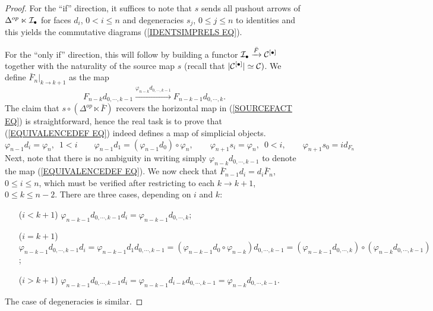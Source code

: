 \documentclass[a4paper,10pt]{article}%
\begin{document}
\begin{proof}
  For the ``if'' direction, it suffices to note that $s$ sends all pushout arrows of $\Delta^{op} \ltimes \mathcal{I}_{\bullet}$ for faces $d_i$, $0<i\leq n$ and degeneracies
  $s_j$, $0\leq j \leq n$ to identities
  and this yields the commutative diagrams (\ref{IDENTSIMPRELS EQ}).

  For the ``only if''  direction, this will follow by building a 
  functor
  $\mathcal{I}_{\bullet} \xrightarrow{\bar{F}} \mathcal{C}^{[\bullet]}$ together with the naturality of the source map $s$ (recall that $|\mathcal{C}^{[\bullet]}|\simeq \mathcal{C})$. We define
  $\bar{F}_n|_{k \to k+1}$ as the map
  \begin{equation}\label{EQUIVALENCEDEF EQ}
    F_{n-k} d_{0,\cdots,k-1}
    \xrightarrow{\varphi_{n-k} d_{0,\cdots,k-1}}
    F_{n-k-1} d_{0,\cdots,k}.
  \end{equation}
  The claim that $s \circ (\Delta^{op} \ltimes \bar{F})$ recovers the horizontal map in (\ref{SOURCEFACT EQ}) is straightforward, hence the real task is to prove that (\ref{EQUIVALENCEDEF EQ}) indeed defines a map of simplicial objects.
  \begin{equation}
    \varphi_{n-1}d_i = \varphi_n,\phantom{1}1<i
    \qquad
    \varphi_{n-1}d_1 = (\varphi_{n-1}d_0) \circ \varphi_n,
    \qquad
    \varphi_{n+1} s_i = \varphi_{n},\phantom{1}0<i,
    \qquad
    \varphi_{n+1} s_{0} =id_{F_{n}}
  \end{equation}
  Next, note that there is no ambiguity in writing simply 
  $\varphi_{n-k} d_{0,\cdots,k-1}$
  to denote the map (\ref{EQUIVALENCEDEF EQ}).
  We now check that $\bar{F}_{n-1} d_i = d_i \bar{F}_n$, $0 \leq i \leq n$, which must be verified after restricting to each $k \to k+1$, $0\leq k \leq n-2$. There are three cases, depending on $i$ and $k$:
  \begin{itemize}
  \item[($i <k+1$)] 
    $\varphi_{n-k-1} d_{0,\cdots,k-1} d_i =
    \varphi_{n-k-1} d_{0,\cdots,k}$;
  \item[($i=k+1$)] 
    $\varphi_{n-k-1} d_{0,\cdots,k-1} d_i =
    \varphi_{n-k-1} d_1 d_{0,\cdots,k-1}=
    (\varphi_{n-k-1} d_0 \circ \varphi_{n-k})d_{0,\cdots,k-1}=
    (\varphi_{n-k-1}d_{0,\cdots,k})\circ(\varphi_{n-k}d_{0,\cdots,k-1})
    $;
  \item[($i>k+1$)] 
    $\varphi_{n-k-1} d_{0,\cdots,k-1} d_i =
    \varphi_{n-k-1} d_{i-k} d_{0,\cdots,k-1} =
    \varphi_{n-k}d_{0,\cdots,k-1}$.
  \end{itemize}
  The case of degeneracies is similar.

\end{proof}
\end{document}
